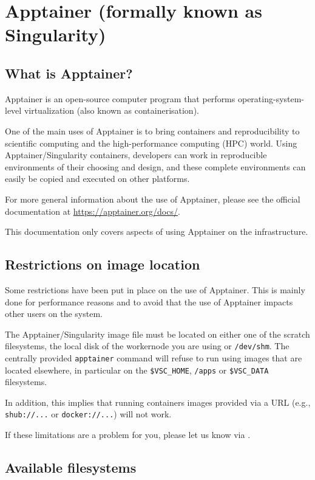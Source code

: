 \chapter{Apptainer (formally known as Singularity)}
\label{ch:apptainer}

\section{What is Apptainer?}

Apptainer is an open-source computer program that performs operating-system-level virtualization (also known as containerisation).

One of the main uses of Apptainer is to bring containers and reproducibility to
scientific computing and the high-performance computing (HPC) world.
Using Apptainer/Singularity containers, developers can work in reproducible environments of their choosing and design,
and these complete environments can easily be copied and executed on other platforms.

For more general information about the use of Apptainer, please see the official documentation at \url{https://apptainer.org/docs/}.

This documentation only covers aspects of using Apptainer on the \hpcInfra infrastructure.

\section{Restrictions on image location}

Some restrictions have been put in place on the use of Apptainer. This is mainly done
for performance reasons and to avoid that the use of Apptainer impacts other users on the system.

The Apptainer/Singularity image file must be located on either one of the scratch filesystems,
the local disk of the workernode you are using or \lstinline|/dev/shm|. The centrally provided \lstinline|apptainer|
command will refuse to run using images that are located elsewhere, in particular on the \lstinline|$VSC_HOME|,
\lstinline|/apps| or \lstinline|$VSC_DATA| filesystems.

In addition, this implies that running containers images provided via a URL
(e.g., \lstinline|shub://...| or \lstinline|docker://...|) will not work.

If these limitations are a problem for you, please let us know via \hpcinfo.

\section{Available filesystems}

